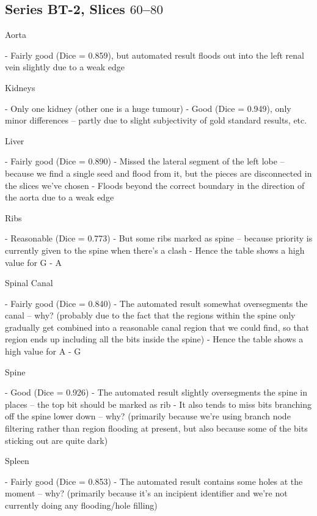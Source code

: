 \subsection{Series BT-2, Slices $60$--$80$}

\iffalse

Aorta

- Fairly good (Dice = 0.859), but automated result floods out into the left renal vein slightly due to a weak edge

Kidneys

- Only one kidney (other one is a huge tumour)
- Good (Dice = 0.949), only minor differences -- partly due to slight subjectivity of gold standard results, etc.

Liver

- Fairly good (Dice = 0.890)
- Missed the lateral segment of the left lobe -- because we find a single seed and flood from it, but the pieces are disconnected in the slices we've chosen
- Floods beyond the correct boundary in the direction of the aorta due to a weak edge

Ribs

- Reasonable (Dice = 0.773)
- But some ribs marked as spine -- because priority is currently given to the spine when there's a clash
  - Hence the table shows a high value for G - A

Spinal Canal

- Fairly good (Dice = 0.840)
- The automated result somewhat oversegments the canal -- why? (probably due to the fact that the regions within the spine only gradually get combined into a reasonable canal region that we could find, so that region ends up including all the bits inside the spine)
  - Hence the table shows a high value for A - G

Spine

- Good (Dice = 0.926)
- The automated result slightly oversegments the spine in places -- the top bit should be marked as rib
- It also tends to miss bits branching off the spine lower down -- why? (primarily because we're using branch node filtering rather than region flooding at present, but also because some of the bits sticking out are quite dark)

Spleen

- Fairly good (Dice = 0.853)
- The automated result contains some holes at the moment -- why? (primarily because it's an incipient identifier and we're not currently doing any flooding/hole filling)

